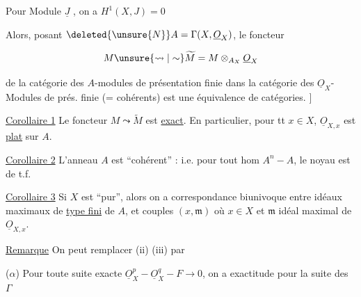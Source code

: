   Pour   Module   $\underline J$ ,  on a $H^1(X,J)=0$  

Alors, posant $\deleted{\unsure{N}}A=\Gamma(X,\underline O_X)$, le foncteur

\[
 M\unsure{\leadsto|\sim}\widetilde M=M\otimes_{A_X}\underline O_X
\]

de la catégorie des $A$-modules de présentation finie dans la catégorie des $\underline O_X$-Modules de prés. finie (= cohérents) est une équivalence de catégories. $\bigr]$


\uline{Corollaire 1} Le foncteur $M\leadsto\widetilde M$ est \uline{exact}. En particulier, pour tt $x\in X$, $\underline O_{X,x}$ est \uline{plat} sur $A$.

\uline{Corollaire 2} L'anneau $A$ est \textquotedblleft cohérent\textquotedblright{} : i.e. pour tout hom $A^n - A$, le noyau est de t.f.

\uline{Corollaire 3} Si $X$ est \textquotedblleft pur\textquotedblright,  alors on a correspondance biunivoque entre idéaux maximaux de \uline{type fini} de $A$, et couples $(x,\mathfrak m)$ où $x\in X$  et $\mathfrak m$ idéal maximal de $\underline O_{X,x}$.

\uline{Remarque} On peut remplacer (ii) (iii) par

($\alpha$) Pour toute suite exacte $\underline O_X^p-\underline O_X^q-F\to0$, on a exactitude pour la suite des $\Gamma$

